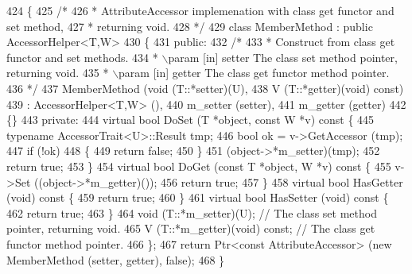 \begin{DoxyCode}
424 \{
425   \textcolor{comment}{/*}
426 \textcolor{comment}{   * AttributeAccessor implemenation with class get functor and set method,}
427 \textcolor{comment}{   * returning void.}
428 \textcolor{comment}{   */}
429   \textcolor{keyword}{class }MemberMethod : \textcolor{keyword}{public} AccessorHelper<T,W>
430   \{
431 \textcolor{keyword}{public}:
432     \textcolor{comment}{/*}
433 \textcolor{comment}{     * Construct from class get functor and set methods.}
434 \textcolor{comment}{     * \(\backslash\)param [in] setter The class set method pointer, returning void.}
435 \textcolor{comment}{     * \(\backslash\)param [in] getter The class get functor method pointer.}
436 \textcolor{comment}{     */}
437     MemberMethod (\textcolor{keywordtype}{void} (T::*setter)(U),
438                   V (T::*getter)(\textcolor{keywordtype}{void}) \textcolor{keyword}{const})
439       : AccessorHelper<T,W> (),
440         m\_setter (setter),
441         m\_getter (getter)
442     \{\}
443 \textcolor{keyword}{private}:
444     \textcolor{keyword}{virtual} \textcolor{keywordtype}{bool} DoSet (T *\textcolor{keywordtype}{object}, \textcolor{keyword}{const} W *v)\textcolor{keyword}{ const }\{
445       \textcolor{keyword}{typename} AccessorTrait<U>::Result tmp;
446       \textcolor{keywordtype}{bool} ok = v->GetAccessor (tmp);
447       \textcolor{keywordflow}{if} (!ok)
448         \{
449           \textcolor{keywordflow}{return} \textcolor{keyword}{false};
450         \}
451       (\textcolor{keywordtype}{object}->*m\_setter)(tmp);
452       \textcolor{keywordflow}{return} \textcolor{keyword}{true};
453     \}
454     \textcolor{keyword}{virtual} \textcolor{keywordtype}{bool} DoGet (\textcolor{keyword}{const} T *\textcolor{keywordtype}{object}, W *v)\textcolor{keyword}{ const }\{
455       v->Set ((object->*m\_getter)());
456       \textcolor{keywordflow}{return} \textcolor{keyword}{true};
457     \}
458     \textcolor{keyword}{virtual} \textcolor{keywordtype}{bool} HasGetter (\textcolor{keywordtype}{void})\textcolor{keyword}{ const }\{
459       \textcolor{keywordflow}{return} \textcolor{keyword}{true};
460     \}
461     \textcolor{keyword}{virtual} \textcolor{keywordtype}{bool} HasSetter (\textcolor{keywordtype}{void})\textcolor{keyword}{ const }\{
462       \textcolor{keywordflow}{return} \textcolor{keyword}{true};
463     \}
464     void (T::*m\_setter)(U);        \textcolor{comment}{// The class set method pointer, returning void.}
465     V (T::*m\_getter)(void) \textcolor{keyword}{const};  \textcolor{comment}{// The class get functor method pointer.}
466   \};
467   \textcolor{keywordflow}{return} Ptr<const AttributeAccessor> (\textcolor{keyword}{new} MemberMethod (setter, getter), \textcolor{keyword}{false});
468 \}
\end{DoxyCode}


